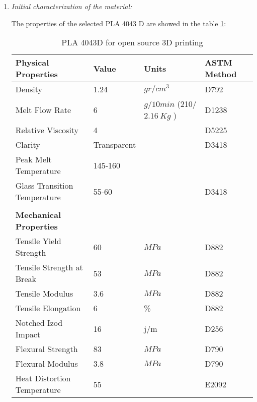 \begin{enumerate}[leftmargin=0in,label=\emph{\alph*}.]
	
	\item \textit{Initial characterization of the material:}
	
	
	
	The properties of the selected PLA 4043 D are showed in the table \ref{PLA}:

	
	\begin{table}[H]
		\centering
		\caption{PLA 4043D for open source 3D printing}  
		\begin{tabular}{llll}
			\toprule
			\textbf{Physical Properties}   & \textbf{Value}  & \textbf{Units}     &  \textbf{ASTM Method}    \\  
			\midrule 
			Density & 1.24 &   $gr/cm^{3}$   & D792 \\
			Melt Flow Rate & 6 & $g/10min$ (210\Celsius /$2.16~Kg$  ) & D1238 \\
			Relative Viscosity & 4 & & D5225\\
			Clarity & Transparent & \Celsius & D3418 \\
			Peak Melt Temperature & 145-160& & \\
			Glass Transition Temperature & 55-60 & \Celsius & D3418 \\
			& & & \\
			\toprule
			\textbf{Mechanical Properties}   &   &      &     \\  
			\midrule  
			Tensile Yield Strength & 60 & $ MPa $ &  D882 \\
			Tensile Strength at Break & 53 & $ MPa $ & D882 \\
			Tensile Modulus & 3.6 & $MPa$ & D882 \\
			Tensile Elongation & 6 & \% & D882 \\
			Notched Izod Impact  & 16 & j/m & D256 \\
			Flexural Strength & 83 & $MPa$ & D790\\
			Flexural Modulus & 3.8 & $MPa$ & D790 \\
			Heat Distortion Temperature & 55 & \Celsius    & E2092     \\
			\bottomrule
		\end{tabular}%
		\label{PLA}%
	\end{table}%
	



\end{enumerate}
